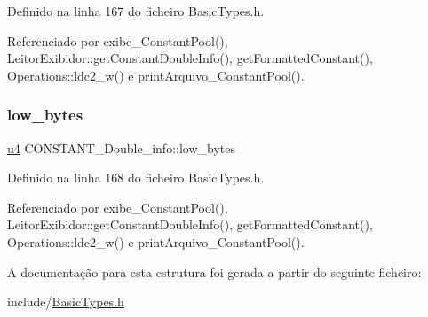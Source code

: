 Definido na linha 167 do ficheiro Basic\+Types.\+h.



Referenciado por exibe\+\_\+\+Constant\+Pool(), Leitor\+Exibidor\+::get\+Constant\+Double\+Info(), get\+Formatted\+Constant(), Operations\+::ldc2\+\_\+w() e print\+Arquivo\+\_\+\+Constant\+Pool().

\mbox{\label{structCONSTANT__Double__info_acb94347bd17a80b4a11d6ee35ae1eee3}} 
\subsubsection{\texorpdfstring{low\+\_\+bytes}{low\_bytes}}
{\footnotesize\ttfamily \hyperlink{BasicTypes_8h_ae5be1f726785414dd1b77d60df074c9d}{u4} C\+O\+N\+S\+T\+A\+N\+T\+\_\+\+Double\+\_\+info\+::low\+\_\+bytes}



Definido na linha 168 do ficheiro Basic\+Types.\+h.



Referenciado por exibe\+\_\+\+Constant\+Pool(), Leitor\+Exibidor\+::get\+Constant\+Double\+Info(), get\+Formatted\+Constant(), Operations\+::ldc2\+\_\+w() e print\+Arquivo\+\_\+\+Constant\+Pool().



A documentação para esta estrutura foi gerada a partir do seguinte ficheiro\+:\begin{DoxyCompactItemize}
\item 
include/\hyperlink{BasicTypes_8h}{Basic\+Types.\+h}\end{DoxyCompactItemize}

